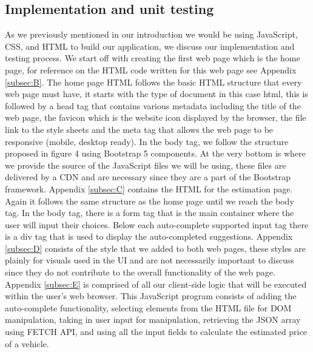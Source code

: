 \documentclass[12pt]{article}
\begin{document}
\subsection{Implementation and unit testing}
As we previously mentioned in our introduction we would be using JavaScript, CSS, and HTML to build our application, we discuss our implementation and testing process. We start off with creating the first web page which is the home page, for reference on the HTML code written for this web page see Appendix \ref{subsec:B}. The home page HTML follows the basic HTML structure that every web page must have, it starts with the type of document in this case html, this is followed by a head tag that contains various metadata including the title of the web page, the favicon which is the website icon displayed by the browser, the file link to the style sheets and the meta tag that allows the web page to be responsive (mobile, desktop ready). In the body tag, we follow the structure proposed in figure 4 using Bootstrap 5 components. At the very bottom is where we provide the source of the JavaScript files we will be using, these files are delivered by a CDN and are necessary since they are a part of the Bootstrap framework. Appendix \ref{subsec:C} contains the HTML for the estimation page. Again it follows the same structure as the home page until we reach the body tag. In the body tag, there is a form tag that is the main container where the user will input their choices. Below each auto-complete supported input tag there is a div tag that is used to display the auto-completed suggestions. Appendix \ref{subsec:D} consists of the style that we added to both web pages, these styles are plainly for visuals used in the UI and are not necessarily important to discuss since they do not contribute to the overall functionality of the web page. Appendix \ref{subsec:E} is comprised of all our client-side logic that will be executed within the user's web browser. This JavaScript program consists of adding the auto-complete functionality, selecting elements from the HTML file for DOM manipulation, taking in user input for manipulation, retrieving the JSON array using FETCH API, and using all the input fields to calculate the estimated price of a vehicle. 
\end{document}
